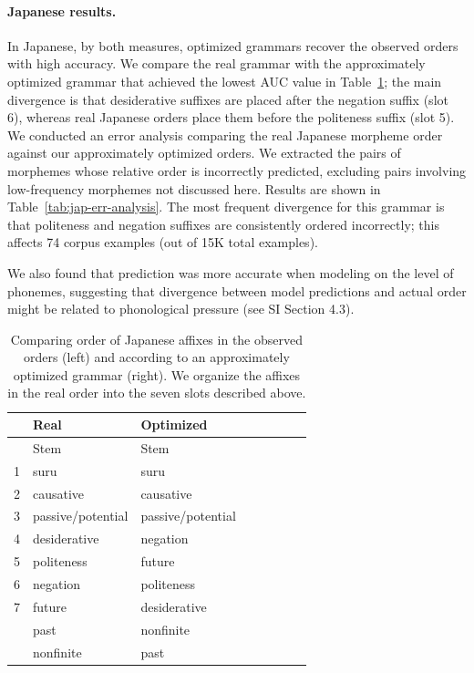 \paragraph{Japanese results.} In Japanese, by both measures, optimized grammars recover the observed orders with high accuracy.
We compare the real grammar with the approximately optimized grammar that achieved the lowest AUC value in Table~\ref{tab:grammar-table-jap}; the main divergence is that desiderative suffixes are placed after the negation suffix (slot 6), whereas real Japanese orders place them before the politeness suffix (slot 5).
We conducted an error analysis comparing the real Japanese morpheme order against our approximately optimized orders.
We extracted the pairs of morphemes whose relative order is incorrectly predicted, excluding pairs involving low-frequency morphemes not discussed here. 
Results are shown in Table~\ref{tab:jap-err-analysis}.
The most frequent divergence for this grammar is that politeness and negation suffixes are consistently ordered incorrectly; this affects 74 corpus examples (out of 15K total examples).

We also found that prediction was more accurate when modeling on the level of phonemes, suggesting that divergence between model predictions and actual order might be related to phonological pressure (see SI Section 4.3).

\begin{table} %
    \centering
    \begin{tabular}{llllllll}
	    &	    Real & Optimized \\ \hline\hline
	    &    Stem & Stem \\ \hline
1 & suru & suru \\
2 & causative & causative \\
3 & passive/potential & passive/potential \\
4 & desiderative & negation \\
5 & politeness & future \\
6 & negation & politeness \\
7 & future & desiderative \\
 & past & nonfinite \\
 & nonfinite & past \\
 \hline
    \end{tabular}
    \caption{Comparing order of Japanese affixes in the observed orders (left) and according to an approximately optimized grammar (right). We organize the affixes in the real order into the seven slots described above.}
    \label{tab:grammar-table-jap}
\end{table}

